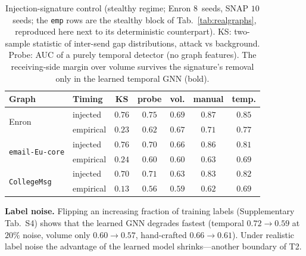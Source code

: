 \begin{table}[pos=tbp]\centering\small
\begin{tabular}{llccccc}
\toprule
Graph & Timing & KS & probe & vol. & manual & temp. \\
\midrule
\multirow{2}{*}{Enron} & injected & $0.76$ & $0.75$ & $0.69$ & $\mathbf{0.87}$ & $0.85$ \\
 & empirical & $0.23$ & $0.62$ & $0.67$ & $0.71$ & $\mathbf{0.77}$ \\
\multirow{2}{*}{\texttt{email-Eu-core}} & injected & $0.76$ & $0.70$ & $0.66$ & $\mathbf{0.86}$ & $0.81$ \\
 & empirical & $0.24$ & $0.60$ & $0.60$ & $0.63$ & $\mathbf{0.69}$ \\
\multirow{2}{*}{\texttt{CollegeMsg}} & injected & $0.70$ & $0.71$ & $0.63$ & $\mathbf{0.83}$ & $0.82$ \\
 & empirical & $0.13$ & $0.56$ & $0.59$ & $0.62$ & $\mathbf{0.69}$ \\
\bottomrule
\end{tabular}
\caption{Injection-signature control (stealthy regime; Enron $8$~seeds, SNAP $10$~seeds; the
\texttt{emp} rows are the stealthy block of Tab.~\ref{tab:realgraphs}, reproduced here next to its
deterministic counterpart). KS: two-sample statistic of inter-send gap distributions, attack vs
background. Probe: AUC of a purely temporal detector (no graph features). The receiving-side margin
over volume survives the signature's removal only in the learned temporal GNN (bold).}
\label{tab:injection}
\end{table}

\smallskip\noindent\textbf{Label noise.} Flipping an increasing fraction of training labels (Supplementary
Tab.~S4) shows that the learned GNN degrades fastest (temporal $0.72\!\to\!0.59$ at $20\%$ noise, volume only
$0.60\!\to\!0.57$, hand-crafted $0.66\!\to\!0.61$). Under realistic label noise the advantage of the learned model shrinks---another boundary
of T2.

